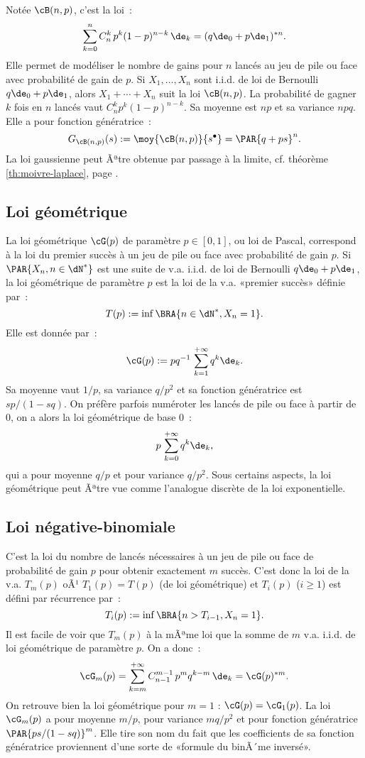 {{Notée $\cB(n,p)$, c'est la loi~:
$$
\sum_{k=0}^n C_n^k\,p^k(1-p)^{n-k}\,\de_k=(q\de_0+p\de_1)^{*n}.
$$
Elle permet de modéliser le nombre de gains pour $n$ lancés au jeu de pile
ou face avec probabilité de gain de $p$. Si $X_1,\ldots,X_n$ sont i.i.d. de loi de
Bernoulli $q\de_0+p\de_1$, alors $X_1+\cdots+X_n$ suit la loi $\cB(n,p)$. La
probabilité de gagner $k$ fois en $n$ lancés vaut $C_n^k p^k(1-p)^{n-k}$. Sa
moyenne est $np$ et sa variance $npq$. Elle a pour fonction génératrice~:
$$
G_{\cB(n,p)}(s):=\moy{\cB(n,p)}{s^\bullet}=\PAR{q+ps}^n.
$$
La loi gaussienne peut Ãªtre obtenue par passage à la limite, cf. théorème
\ref{th:moivre-laplace}, page \pageref{th:moivre-laplace}.

%
\subsection{Loi géométrique}\label{ss:loi:geometrique}
%

La loi géométrique $\cG(p)$ de paramètre $p\in[0,1]$, ou loi de Pascal,
correspond à la loi du premier succès à un jeu de pile ou face avec
probabilité de gain $p$. Si $\PAR{X_n,n\in\dN^*}$ est une suite de v.a. i.i.d.
de loi de Bernoulli $q\de_0+p\de_1$, la loi géométrique de paramètre $p$ est
la loi de la v.a. «premier succès» définie par~:
$$
T(p):=\inf\BRA{n\in\dN^*, X_n=1}.
$$
Elle est donnée par~:
$$
\cG(p):=pq^{-1}\,\sum_{k=1}^{+\infty} q^k\de_k.
$$
Sa moyenne vaut $1/p$, sa variance $q/p^2$ et sa fonction génératrice est
$sp/(1-sq)$. On préfère parfois numéroter les lancés de pile ou face à partir
de $0$, on a alors la loi géométrique de base $0$~:
$$
p\,\sum_{k=0}^{+\infty} q^k\de_k,
$$
qui a pour moyenne $q/p$ et pour variance $q/p^2$.
Sous certains aspects, la loi géométrique peut Ãªtre vue
comme l'analogue discrète de la loi exponentielle. 

%
\subsection{Loi négative-binomiale}\label{ss:loi:negative-binomiale}
%

C'est la loi du nombre de lancés nécessaires à un jeu de pile ou face de
probabilité de gain $p$ pour obtenir exactement $m$ succès.  C'est donc la loi
de la v.a. $T_m(p)$ oÃ¹ $T_1(p)=T(p)$ (de loi géométrique) et $T_i(p)$ ($i\geq 1$) est
défini par récurrence par~:
$$
T_i(p):=\inf\BRA{n>T_{i-1}, X_n=1}.
$$
Il est facile de voir que $T_m(p)$ à la mÃªme loi que la somme de $m$ v.a.
i.i.d. de loi géométrique de paramètre $p$. On a donc~:
$$
\cG_m(p)= \sum_{k=m}^{+\infty} C_{n-1}^{m-1}\,p^m q^{k-m} \,\de_k
= \cG(p)^{*m}.
$$
On retrouve bien la loi géométrique pour $m=1$ : $\cG(p)=\cG_1(p)$. La loi
$\cG_m(p)$ a pour moyenne $m/p$, pour variance $mq/p^2$ et pour fonction
génératrice $\PAR{ps/(1-sq)}^m$. Elle tire son nom du fait que les
coefficients de sa fonction génératrice proviennent d'une sorte de «formule du
binÃ´me inversé».

}}
